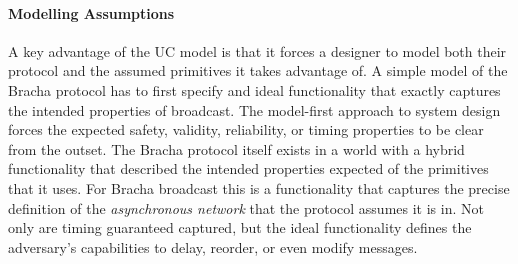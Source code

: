 
\paragraph{Modelling Assumptions} 
A key advantage of the UC model is that it forces a designer to model both their protocol and the assumed primitives it takes advantage of.
A simple model of the Bracha protocol has to first specify and ideal functionality that exactly captures the intended properties of broadcast.
The model-first approach to system design forces the expected safety, validity, reliability, or timing properties to be clear from the outset.
The Bracha protocol itself exists in a world with a hybrid functionality that described the intended properties expected of the primitives that it uses.
For Bracha broadcast this is a functionality that captures the precise definition of the \emph{asynchronous network} that the protocol assumes it is in.
Not only are timing guaranteed captured, but the ideal functionality defines the adversary's capabilities to delay, reorder, or even modify messages. 

